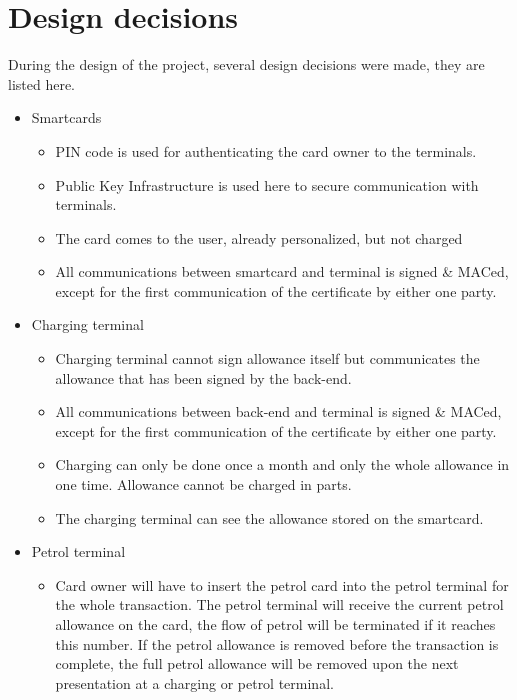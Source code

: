 \section{Design decisions}
During the design of the project, several design decisions were made, they are listed here.
\begin{itemize}
\item Smartcards
\begin{itemize}
\item PIN code is used for authenticating the card owner to the terminals.
\item Public Key Infrastructure is used here to secure communication with terminals.
\item The card comes to the user, already personalized, but not charged
\item All communications between smartcard and terminal is signed \& MACed, except for the first communication of the certificate by either one party.
\end{itemize}

\item Charging terminal
\begin{itemize}
\item Charging terminal cannot sign allowance itself but communicates the allowance that has been signed by the back-end.
\item All communications between back-end and terminal is signed \& MACed, except for the first communication of the certificate by either one party.
\item Charging can only be done once a month and only the whole allowance in one time. Allowance cannot be charged in parts.
\item The charging terminal can see the allowance stored on the smartcard.
\end{itemize}

\item Petrol terminal
\begin{itemize}
\item Card owner will have to insert the petrol card into the petrol terminal for the whole transaction. The petrol terminal will receive the current petrol allowance on the card, the flow of petrol will be terminated if it reaches this number. If the petrol allowance is removed before the transaction is complete, the full petrol allowance will be removed upon the next presentation at a charging or petrol terminal. 


\end{itemize}
\end{itemize}
